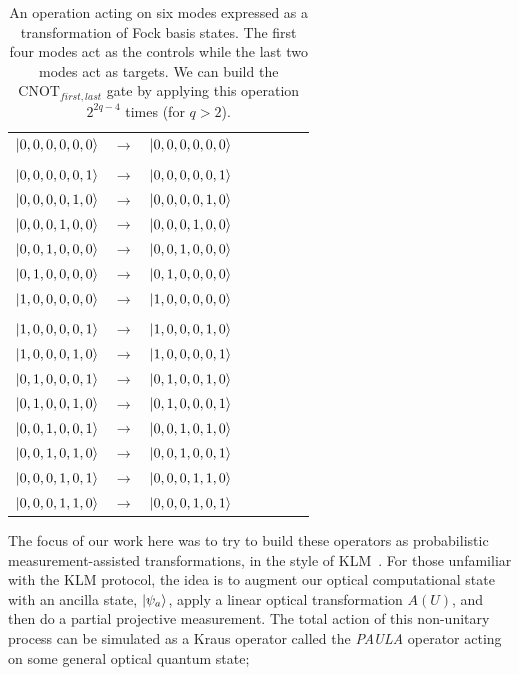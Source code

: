 \documentclass[aps,pra,twocolumn,showpacs,superscriptaddress,floatfix,10pt]{revtex4}
\begin{document}
\begin {table}[h]
\begin{center}
	\begin{tabular}{l*{6}{c}r} 
		$\ket{0,0,0,0,0,0}$  &  $\rightarrow$ & $\ket{0,0,0,0,0,0}$ \\ \\
		$\ket{0,0,0,0,0,1}$  & $\rightarrow$ & $\ket{0,0,0,0,0,1}$ \\
		$\ket{0,0,0,0,1,0}$ & $\rightarrow$ & $\ket{0,0,0,0,1,0}$ \\
		$\ket{0,0,0,1,0,0}$ & $\rightarrow$ & $\ket{0,0,0,1,0,0} $ \\ 
		$\ket{0,0,1,0,0,0}$ & $\rightarrow$ & $\ket{0,0,1,0,0,0} $\\
		$\ket{0,1,0,0,0,0}$ & $\rightarrow$ & $\ket{0,1,0,0,0,0} $ \\
		$\ket{1,0,0,0,0,0}$ & $\rightarrow$ & $\ket{1,0,0,0,0,0} $ \\ \\
		
		$\ket{1,0,0,0,0,1}$  & $\rightarrow$ & $\ket{1,0,0,0,1,0}$ \\
		$\ket{1,0,0,0,1,0}$  & $\rightarrow$ & $\ket{1,0,0,0,0,1}$ \\
		$\ket{0,1,0,0,0,1}$  & $\rightarrow$ & $\ket{0,1,0,0,1,0}$ \\
		$\ket{0,1,0,0,1,0}$  & $\rightarrow$ & $\ket{0,1,0,0,0,1}$ \\
		$\ket{0,0,1,0,0,1}$  & $\rightarrow$ & $\ket{0,0,1,0,1,0}$ \\
		$\ket{0,0,1,0,1,0}$  & $\rightarrow$ & $\ket{0,0,1,0,0,1}$ \\
		$\ket{0,0,0,1,0,1}$  & $\rightarrow$ & $\ket{0,0,0,1,1,0}$ \\
		$\ket{0,0,0,1,1,0}$  & $\rightarrow$ & $\ket{0,0,0,1,0,1}$ \\
	\end{tabular}
	\caption{ \label{Four Controls two Targets} An operation acting on six modes expressed as a transformation of Fock basis states. The first four modes act as the controls while the last two modes act as targets. We can build the $\mbox{CNOT}_{first,last}$ gate by applying this operation $2^{2 q - 4}$ times (for $q>2$).}
\end{center}
\end{table} 
The focus of our work here was to try to build these operators as probabilistic measurement-assisted transformations, in the style of KLM~\cite{KLM}. For those unfamiliar with the KLM protocol, the idea is to augment our optical computational state with an ancilla state, $\ket{\psi_a}$, apply a linear optical transformation $A(U)$, and then do a partial projective measurement. The total action of this non-unitary process can be simulated as a Kraus operator called the \textit{PAULA} operator acting on some general optical quantum state;
\end{document}
